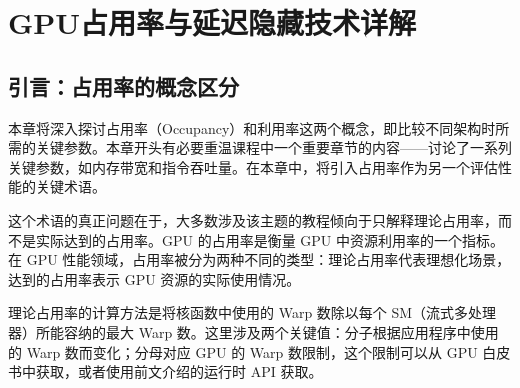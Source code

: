 \section{GPU占用率与延迟隐藏技术详解}

\subsection{引言：占用率的概念区分}

本章将深入探讨占用率（Occupancy）和利用率这两个概念，即比较不同架构时所需的关键参数。本章开头有必要重温课程中一个重要章节的内容——讨论了一系列关键参数，如内存带宽和指令吞吐量。在本章中，将引入占用率作为另一个评估性能的关键术语。

这个术语的真正问题在于，大多数涉及该主题的教程倾向于只解释理论占用率，而不是实际达到的占用率。GPU 的占用率是衡量 GPU 中资源利用率的一个指标。在 GPU 性能领域，占用率被分为两种不同的类型：理论占用率代表理想化场景，达到的占用率表示 GPU 资源的实际使用情况。

理论占用率的计算方法是将核函数中使用的 Warp 数除以每个 SM（流式多处理器）所能容纳的最大 Warp 数。这里涉及两个关键值：分子根据应用程序中使用的 Warp 数而变化；分母对应 GPU 的 Warp 数限制，这个限制可以从 GPU 白皮书中获取，或者使用前文介绍的运行时 API 获取。

